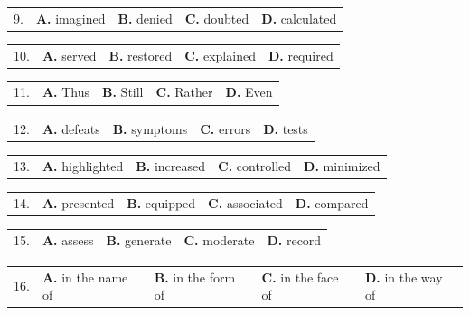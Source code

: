 \documentclass[UTF8,11pt]{ctexart}
\begin{document}
\noindent\begin{tabularx}{\linewidth}{@{}lXXXX@{}}9. & \textbf{A.} imagined & \textbf{B.} denied & \textbf{C.} doubted & \textbf{D.} calculated\\\end{tabularx}\par

\noindent\begin{tabularx}{\linewidth}{@{}lXXXX@{}}10. & \textbf{A.} served & \textbf{B.} restored & \textbf{C.} explained & \textbf{D.} required\\\end{tabularx}\par

\noindent\begin{tabularx}{\linewidth}{@{}lXXXX@{}}11. & \textbf{A.} Thus & \textbf{B.} Still & \textbf{C.} Rather & \textbf{D.} Even\\\end{tabularx}\par

\noindent\begin{tabularx}{\linewidth}{@{}lXXXX@{}}12. & \textbf{A.} defeats & \textbf{B.} symptoms & \textbf{C.} errors & \textbf{D.} tests\\\end{tabularx}\par

\noindent\begin{tabularx}{\linewidth}{@{}lXXXX@{}}13. & \textbf{A.} highlighted & \textbf{B.} increased & \textbf{C.} controlled & \textbf{D.} minimized\\\end{tabularx}\par

\noindent\begin{tabularx}{\linewidth}{@{}lXXXX@{}}14. & \textbf{A.} presented & \textbf{B.} equipped & \textbf{C.} associated & \textbf{D.} compared\\\end{tabularx}\par

\noindent\begin{tabularx}{\linewidth}{@{}lXXXX@{}}15. & \textbf{A.} assess & \textbf{B.} generate & \textbf{C.} moderate & \textbf{D.} record\\\end{tabularx}\par

\noindent\begin{tabularx}{\linewidth}{@{}lXXXX@{}}16. & \textbf{A.} in the name of & \textbf{B.} in the form of & \textbf{C.} in the face of & \textbf{D.} in the way of\\\end{tabularx}\par
\end{document}
